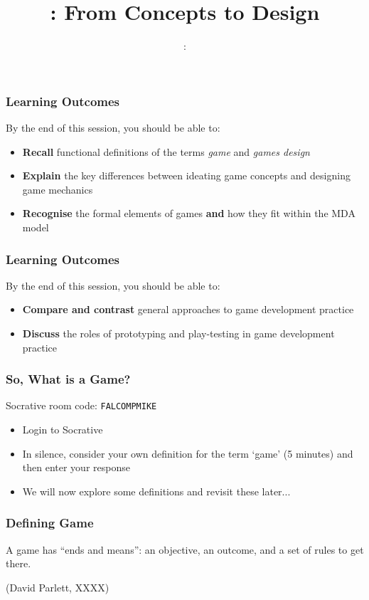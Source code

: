 \documentclass[handout, xcolor={dvipsnames}]{beamer}\usepackage{etoolbox}\newtoggle{printable}\toggletrue{printable}
\newcommand{\socrative}{
	\begin{center}
		Socrative room code: \texttt{FALCOMPMIKE}
	\end{center}
}
\begin{document}
\title{\sessionnumber: From Concepts to Design}
\subtitle{\modulecode: \moduletitle}

\frame{\titlepage} 

\begin{frame}
	\frametitle{Learning Outcomes}
	
	By the end of this session, you should be able to:
	
	\begin{itemize}
		\item \textbf{Recall} functional definitions of the terms \textit{game} and \textit{games design}
		\item \textbf{Explain} the key differences between ideating game concepts and designing game mechanics
		\item \textbf{Recognise} the formal elements of games \textbf{and} how they fit within the MDA model
	\end{itemize}
\end{frame}

\begin{frame}
	\frametitle{Learning Outcomes}
	
	By the end of this session, you should be able to:
	
	\begin{itemize}
		\item \textbf{Compare and contrast} general approaches to game development practice
		\item \textbf{Discuss} the roles of prototyping and play-testing in game development practice
	\end{itemize}
\end{frame}

\begin{frame}
	\frametitle{So, What is a Game?}
	
	\socrative
	
	\begin{itemize}
		\item Login to Socrative
		\item In silence, consider your own definition for the term `game' (5 minutes) and then enter your response
		\item We will now explore some definitions and revisit these later...
	\end{itemize}

\end{frame}

\begin{frame}
	\frametitle{Defining Game}
		
	\begin{center}
	\begin{huge}
	A game has ``ends and means'': an objective, an outcome, and a set of rules to get there.
	\end{huge}
	
	\vspace{3em}
	
	(David Parlett, XXXX)
	\end{center}

\end{frame}
\end{document}
